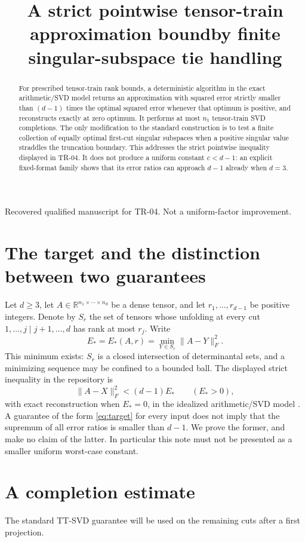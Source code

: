 \documentclass[11pt]{article}
\title{A strict pointwise tensor-train approximation bound\newline by finite singular-subspace tie handling}
\author{}
\date{}
\newcommand{\R}{\mathbb R}
\begin{document}
\maketitle
\begin{center}\small Recovered qualified manuscript for TR-04. Not a uniform-factor improvement.\end{center}
\begin{abstract}
For prescribed tensor-train rank bounds, a deterministic algorithm in
the exact arithmetic/SVD model returns an approximation with squared
error strictly smaller than $(d-1)$ times the optimal squared error
whenever that optimum is positive, and reconstructs exactly at zero
optimum. It performs at most $n_1$ tensor-train SVD completions. The only
modification to the standard construction is to test a finite collection
of equally optimal first-cut singular subspaces when a positive singular
value straddles the truncation boundary. This addresses the strict
pointwise inequality displayed in TR-04. It does not produce a uniform
constant $c<d-1$: an explicit fixed-format family shows that its error
ratios can approach $d-1$ already when $d=3$.
\end{abstract}

\section{The target and the distinction between two guarantees}
Let $d\ge3$, let $A\in\R^{n_1\times\cdots\times n_d}$ be a dense tensor,
and let $r_1,\ldots,r_{d-1}$ be positive integers. Denote by $S_r$ the
set of tensors whose unfolding at every cut $1,\ldots,j\mid j+1,\ldots,d$
has rank at most $r_j$. Write
\[
 E_* = E_*(A,r)=\min_{Y\in S_r}\|A-Y\|_F^2.
\]
This minimum exists: $S_r$ is a closed intersection of determinantal
sets, and a minimizing sequence may be confined to a bounded ball.
The displayed strict inequality in the repository is
\begin{equation}\label{eq:target}
 \|A-X\|_F^2<(d-1)E_*\qquad(E_*>0),
\end{equation}
with exact reconstruction when $E_*=0$, in the idealized arithmetic/SVD
model \cite{repo,workshop}.
A guarantee of the form \eqref{eq:target} for every input does not imply
that the supremum of all error ratios is smaller than $d-1$. We prove
the former, and make no claim of the latter. In particular this note
must not be presented as a smaller uniform worst-case constant.

\section{A completion estimate}
The standard TT-SVD guarantee \cite[Theorem 2.2 and Corollary 2.4]{O}
will be used on the remaining cuts after a first projection.
\end{document}
